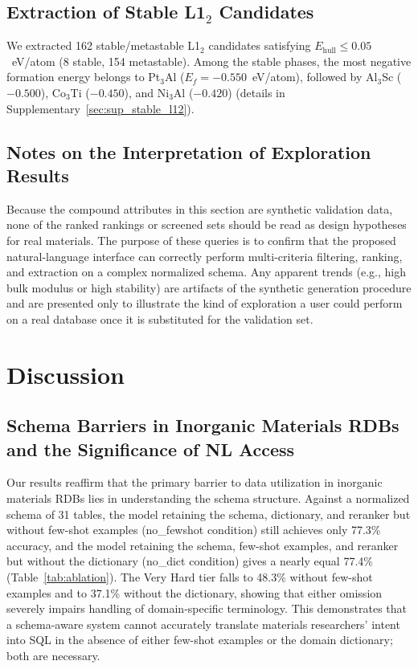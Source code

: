 \documentclass{npj-compt.mater}
\begin{document}
\subsection{Extraction of Stable L1$_2$ Candidates}
\label{sec:stable_l12}

We extracted 162 stable/metastable L1$_2$ candidates satisfying
$E_\text{hull} \leq 0.05$~eV/atom (8 stable, 154 metastable).
Among the stable phases, the most negative formation energy belongs
to Pt$_3$Al ($E_f = -0.550$~eV/atom), followed by
Al$_3$Sc ($-0.500$), Co$_3$Ti ($-0.450$), and
Ni$_3$Al ($-0.420$)
(details in Supplementary~\ref{sec:sup_stable_l12}).

\subsection{Notes on the Interpretation of Exploration Results}

Because the compound attributes in this section are synthetic
validation data, none of the ranked rankings or screened sets should
be read as design hypotheses for real materials.  The purpose of
these queries is to confirm that the proposed natural-language
interface can correctly perform multi-criteria filtering, ranking,
and extraction on a complex normalized schema.  Any apparent
trends (e.g., high bulk modulus or high stability) are artifacts of
the synthetic generation procedure and are presented only to
illustrate the kind of exploration a user could perform on a real
database once it is substituted for the validation set.

\section{Discussion}
\label{sec:discussion}

\subsection{Schema Barriers in Inorganic Materials RDBs and the Significance of NL Access}

Our results reaffirm that the primary barrier to data utilization
in inorganic materials RDBs lies in understanding the schema
structure.
Against a normalized schema of 31 tables, the model retaining the
schema, dictionary, and reranker but without few-shot examples
(no\_fewshot condition) still achieves only 77.3\% accuracy, and
the model retaining the schema, few-shot examples, and reranker
but without the dictionary (no\_dict condition) gives a nearly
equal 77.4\% (Table~\ref{tab:ablation}). The Very Hard tier falls
to 48.3\% without few-shot examples and to 37.1\% without the
dictionary, showing that either omission severely impairs
handling of domain-specific terminology.
This demonstrates that a schema-aware system cannot accurately
translate materials researchers' intent into SQL in the absence
of either few-shot examples or the domain dictionary; both are
necessary.
\end{document}
